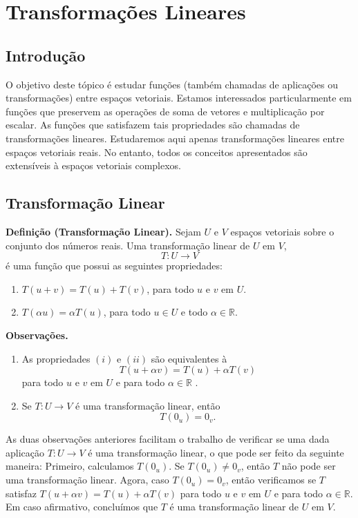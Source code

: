 \chapter{Transformações Lineares}
\thispagestyle{empty}

\section{Introdução}
O objetivo deste tópico é estudar funções (também chamadas de aplicações ou transformações) entre espaços vetoriais.  Estamos interessados particularmente em funções que preservem as operações de soma de vetores e multiplicação por escalar. As funções que satisfazem tais propriedades  são chamadas de transformações lineares. Estudaremos aqui apenas transformações lineares entre espaços vetoriais reais. No entanto, todos os conceitos apresentados são extensíveis à espaços vetoriais complexos.

\section{Transformação Linear}


\textbf{Definição (Transformação Linear).} Sejam $U$  e $V$ espaços vetoriais sobre o conjunto dos números reais.  Uma transformação linear de $U$ em $V$, $$T: U \rightarrow V$$  é uma função que possui as seguintes propriedades:
\begin{enumerate}[label=(\roman*)]
\item $T(u+v)=T(u)+T(v)$, para todo $u$ e $v$ em $U$.
\item $T(\alpha u )= \alpha T(u)$, para todo $u \in U$ e todo $\alpha \in \mathbb{R}$.
\end{enumerate}

\vspace{0.7cm}
\noindent \textbf{Observações.}

\begin{enumerate}
\item  {As propriedades $(i)$ e $(ii)$ são equivalentes à  $$ T(u+\alpha v)= T(u)+ \alpha T(v)$$ para todo $u$ e $v$ em $U$ e para todo $\alpha \in \mathbb{R}$ .}

\item Se $T: U \rightarrow V$ é uma transformação linear, então $$T(0_u)=0_v.$$
\end{enumerate}

As duas observações anteriores facilitam o trabalho de verificar se uma dada aplicação $T: U \rightarrow V$ é uma transformação linear, o que pode ser feito da seguinte maneira:  Primeiro, calculamos $T(0_u)$.    Se $T(0_u) \neq 0_v$, então  $T$ não pode ser uma transformação linear.  Agora,  caso $T(0_u)=0_v$,  então verificamos se  $T$  satisfaz $ T(u+\alpha v)= T(u)+ \alpha T(v)$ para todo $u$ e $v$ em $U$ e para todo $\alpha \in \mathbb{R}$. Em caso afirmativo, concluímos que $T$ é uma transformação linear de $U$ em $V$.


